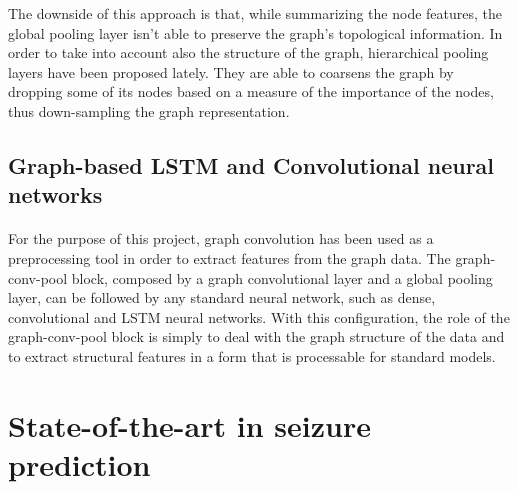 The downside of this approach is that, while summarizing the node features, the global pooling layer isn’t able to preserve the graph’s topological information. In order to take into account also the structure of the graph, hierarchical pooling layers have been proposed lately. They are able to coarsens the graph by dropping some of its nodes based on a measure of the importance of the nodes, thus down-sampling the graph representation.

\subsection{Graph-based LSTM and Convolutional neural networks}
\paragraph{} For the purpose of this project, graph convolution has been used as a preprocessing tool in order to extract features from the graph data. The graph-conv-pool block, composed by a graph convolutional layer and a global pooling layer, can be followed by any standard neural network, such as dense, convolutional and LSTM neural networks. With this configuration, the role of the graph-conv-pool block is simply to deal with the graph structure of the data and to extract structural features in a form that is processable for standard models.

\section{State-of-the-art in seizure prediction}